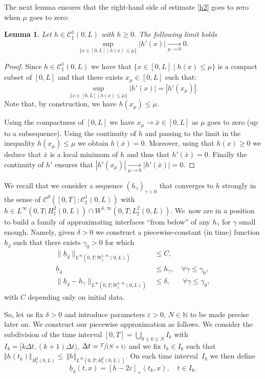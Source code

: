 \documentclass[10pt]{amsart}
\let\mathcal\mathscr
\newcommand{\spfrac}[2]{\sfrac{#1}{(#2)}}
\newtheorem{lemma}[theorem]{Lemma}
\theoremstyle{remark}
\theoremstyle{definition}
\newcommand{\norme}[1]{\,\Vert #1\Vert}
\newcommand{\vnorme}[1]{\Vert #1\Vert}
\newcommand{\hb}{{\underline{h}}}
\begin{document}
The next lemma ensures that the right-hand side of estimate \eqref{h2} goes to zero when $\mu$ goes to zero:
\begin{lemma}\label{lemma.conv.zero}Let $h \in \mathcal{C}_\sharp^{1}(0,L)$ with $h\geq 0$. The following limit holds
\[\sup_{\{x\in [0, L]\mid h(x)\leq\mu\}}\vert h'(x)\vert \underset{\mu\to 0}{\to} 0.
\]
\end{lemma}
\begin{proof}Since $ h \in \mathcal{C}^1_\sharp(0,L)$ we have that $\{ x \in [0,L]\mid h(x)\leq\mu\}$ is a compact subset of $[0,L]$ and that there exists $x_{\mu}\in [0,L]$ such that:
\[
\sup_{\{x\in [0, L]\mid h(x)\leq\mu\}} |h'(x)|= |h'(x_{\mu})|.
\]
Note that, by construction, we have $h(x_{\mu})\leq \mu$.

Using the compactness of $[0,L]$ we have $x_{\mu}\to \bar x\in [0,L]$ as $\mu$ goes to zero (up to a subsequence). Using the continuity of $h$ and passing to the limit in the inequality $h(x_{\mu})\leq \mu$ we obtain $h(\bar x)=0$. Moreover, using that $h(x)\geq 0$ we deduce that $\bar x$ is a local minimum of $h$ and thus that $h'(\bar x)=0$. Finally the continuity of $h'$ ensures that $|h'(x_{\mu})|\underset{\mu\to 0}{\to}|h'(\bar x)|=0$.
\end{proof}

We recall that we consider a sequence $(h_{\gamma})_{\gamma >0}$
that converges to $h$ strongly in the sense of $\mathcal{C}^{0}([0,T];\mathcal{C}_\sharp^{1}(0,L))$ with $h\in L^{\infty}(0,T;H_\sharp^{2}(0,L)) \cap W^{1,\infty}(0, T; L^2_\sharp(0, L))$.
We~now are in a position to build a family of approximating interfaces ``from below'' of any $h_\gamma$ for $\gamma$ small enough. Namely, given $\delta >0$ we construct a piecewise-constant (in time) function $\underline{h}_{\delta}$
such that there exists $\gamma_0 >0$ for which
\begin{align}
\|\hb_{\delta}\|_{L^{\infty}(0,T;W^{1,\infty}_{\sharp}(0,L))} &\leq C, \label{estimate.hb}\\
\hb_{\delta}&\leq h_{\gamma}, \quad\forall \gamma\leq\gamma_{0}, \label{eq.interfacebelow}\\
\| \hb_{\delta}- h_\gamma\|_{L^\infty(0,T; W_\sharp^{1, \infty}(0, L))}&\leq \delta, \;\;\,\quad\forall \gamma\leq\gamma_{0}, \label{estimation-diffth}
\end{align}
with $C$ depending only on initial data.

So, let us fix $\delta >0$ and introduce parameters $\varepsilon >0$, $N\in \mathbb N$ to be made precise later on.
We construct our piecewise approximation as follows. We consider the subdivision of the time interval $[0,T]=\bigcup_{0\leq k\leq N}I_{k}$ with $I_{k}=[k\Delta t,(k+1)\Delta t)$, $\Delta t=\spfrac{T}{N+1}$ and we fix $t_{k}\in I_{k}$ such that $\vnorme{h(t_{k})}_{H^{2}_{\sharp}(0,L)}\leq \norme{h}_{L^{\infty}(0,T;H^{2}_{\sharp}(0,L))}$. On each time interval~$I_k$ we then define
\begin{equation}
\label{def-sous-h}
\hb_{\delta}(t, x)= [h-2\varepsilon]_+(t_{k},x), \quad t\in I_k.
\end{equation}
\end{document}

